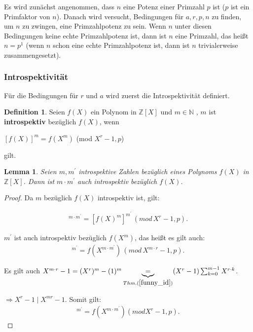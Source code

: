\documentclass[12pt,oneside]{article}
\newtheorem{lemma}[theorem]{Lemma}
\theoremstyle{remark}
\theoremstyle{definition}
\newtheorem{definition}{Definition}[section]
\begin{document}
\begin{flushleft}
Es wird zunächst angenommen, dass $n$ eine Potenz einer Primzahl $p$ ist ($p$ ist ein Primfaktor von $n$). Danach wird versucht, Bedingungen für $a, r,p,n$ zu finden, um $n$ zu zwingen, eine Primzahlpotenz zu sein. Wenn $n$ unter diesen Bedingungen keine echte Primzahlpotenz ist, dann ist $n$ eine Primzahl, das heißt $n = p^1$ (wenn $n$ schon eine echte Primzahlpotenz ist, dann ist $n$ trivialerweise zusammengesetzt). 

\subsubsection{Introspektivität}
Für die Bedingungen für $r$ und $a$ wird zuerst die Introspektivität definiert.

\begin{definition}
Seien $f(X)$ ein Polynom in $\mathbb{Z}[X]$ und $m \in \mathbb{N}$ , $m$ ist \textbf{introspektiv} bezüglich $f(X)$, wenn\newline\newline
    \centerline{$[f(X)]^{m} = f(X^m)$ (mod $X^r - 1,p$)} 
gilt. 
\end{definition}

\smallskip

\begin{lemma}\label{intros_num}
Seien $m,m^{'}$ introspektive Zahlen bezüglich eines Polynoms $f(X)$ in $\mathbb{Z}[X]$. Dann ist $m \cdot m^{'}$ auch introspektiv bezüglich $f(X)$.
\end{lemma}

\begin{proof}
Da $m$ bezüglich $f(X)$ introspektiv ist, gilt:\newline

\begin{align*}
    [f(X)]^{m \cdot m^{'}} = [f(X)^{m}]^{m^{'}} \, ( mod \,  X^r - 1, p).
\end{align*}

$m^{'}$ ist auch introspektiv bezüglich $f(X^{m})$, das heißt es gilt auch:\newline
\begin{align*}
    [f(X^m)]^{m^{'}} = f(X^{m \cdot m^{'}}) \, ( mod \, X^{m\cdot r} - 1, p).
\end{align*}

Es gilt auch $X^{m \cdot r } - 1 = (X^{r})^{m} - (1)^m \underbrace{=}_{Thm. (\ref{funny_id})} (X^{r} - 1) \sum_{k = 0}^{m-1} X^{r \cdot k}$.

$\Rightarrow X^{r} - 1\mid X^{mr} - 1$. Somit gilt:
\begin{align*}
    [f(X^m)]^{m^{'}} = f(X^{m \cdot m^{'}})( mod X^{r} - 1,p).
\end{align*}


\end{proof}
\end{flushleft}
\end{document}
